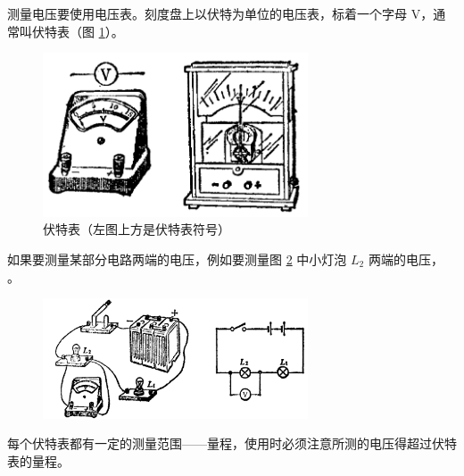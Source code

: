 测量电压要使用电压表。刻度盘上以伏特为单位的电压表，标着一个字母 V，通常叫伏特表（图 \ref{fig:8-10}）。

\begin{figure}[htbp]
    \centering
    \includegraphics[width=0.7\textwidth]{../pic/czwl2-ch8-10}
    \caption{伏特表（左图上方是伏特表符号）}\label{fig:8-10}
\end{figure}

如果要测量某部分电路两端的电压，例如要测量图 \ref{fig:8-11} 中小灯泡 $L_2$ 两端的电压，
。

\begin{figure}[htbp]
    \centering
    \includegraphics[width=0.7\textwidth]{../pic/czwl2-ch8-11}
    \caption{}\label{fig:8-11}
\end{figure}

每个伏特表都有一定的测量范围——量程，使用时必须注意所测的电压得超过伏特表的量程。

